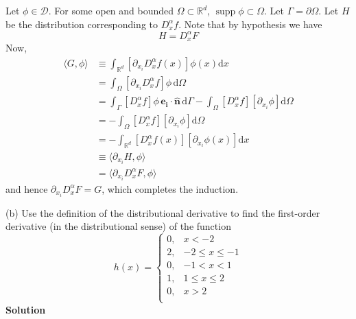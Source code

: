 \documentclass{article}
\DeclareMathOperator\supp{supp}
\begin{document}
Let $\phi \in \mathcal{D}$. For some open and bounded
$\Omega \subset \mathbb{R}^d$, $\supp \phi \subset \Omega$. Let
$\Gamma = \partial \Omega$. Let $H$ be the distribution
corresponding to $D_x^\alpha f$. Note that by hypothesis we have
%
\begin{equation*}
    H = D_x^\alpha F
\end{equation*}
%
Now,
%
\begin{align*}
    \langle G, \phi \rangle
        &\equiv \int_{\mathbb{R}^d} \left[\partial_{x_i} D_x^\alpha f(x)\right] \phi(x) \mathrm{d} x \\
        &= \int_{\Omega} \left[\partial_{x_i} D_x^\alpha f\right] \phi \,\mathrm{d} \Omega \\
        &= \int_{\Gamma} \left[D_x^\alpha f\right] \phi \,\mathbf{e_i} \cdot \mathbf{\hat{n}} \,\mathrm{d} \Gamma
            - \int_{\Omega} \left[D_x^\alpha f\right] \left[ \partial_{x_i} \phi \right] \mathrm{d} \Omega \\
        &= - \int_{\Omega} \left[D_x^\alpha f\right] \left[ \partial_{x_i} \phi \right] \mathrm{d} \Omega \\
        &= - \int_{\mathbb{R}^d} \left[D_x^\alpha f(x)\right] \left[ \partial_{x_i} \phi(x) \right] \mathrm{d} x \\
        &\equiv \langle \partial_{x_i} H, \phi \rangle \\
        &= \langle \partial_{x_i} D_x^\alpha F, \phi \rangle
\end{align*}
%
and hence $\partial_{x_i} D_x^\alpha F = G$, which completes the induction.

\vspace{5mm}

(b) Use the definition of the distributional derivative to find the
first-order derivative (in the distributional sense) of the function
%
\begin{equation*}
    h(x) =
        \begin{cases}
            0, & x < -2 \\
            2, & -2 \leq x \leq -1 \\
            0, & -1 < x < 1 \\
            1, & 1 \leq x \leq 2 \\
            0, & x > 2 \\
        \end{cases}
\end{equation*}
%
\textbf{Solution}
\end{document}
